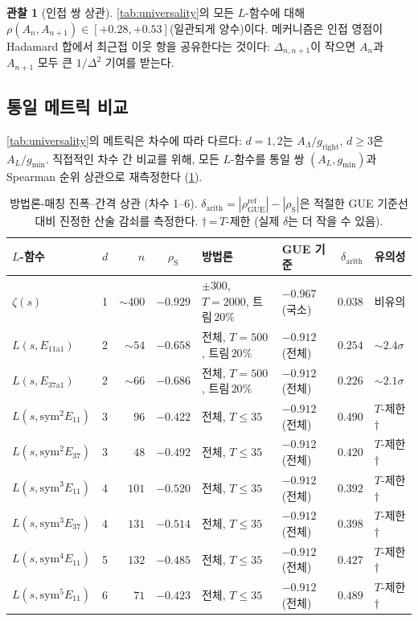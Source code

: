 \documentclass[11pt,a4paper]{article}
\theoremstyle{plain}
\theoremstyle{definition}
\newtheorem{observation}[theorem]{관찰}
\DeclareMathOperator{\GUE}{GUE}
\newcommand{\La}{\Lambda}
\begin{document}
\begin{observation}[인접 쌍 상관]\label{obs:adjacent}
\cref{tab:universality}의 모든 $L$-함수에 대해
$\rho(A_n, A_{n+1}) \in [+0.28, +0.53]$(일관되게 양수)이다.
메커니즘은 인접 영점이 Hadamard 합에서 최근접 이웃 항을 공유한다는 것이다:
$\Delta_{n,n+1}$이 작으면 $A_n$과 $A_{n+1}$ 모두 큰 $1/\Delta^2$ 기여를 받는다.
\end{observation}

\subsection{통일 메트릭 비교}
\label{ssec:unified}

\cref{tab:universality}의 메트릭은 차수에 따라 다르다:
$d = 1,2$는 $A_\La / g_{\mathrm{right}}$, $d \ge 3$은
$A_L / g_{\min}$.
직접적인 차수 간 비교를 위해, 모든 $L$-함수를
통일 쌍 $(A_L, g_{\min})$과 Spearman 순위 상관으로 재측정한다
(\cref{tab:unified}).

\begin{table}[h]
\centering
\caption{방법론-매칭 진폭--간격 상관 (차수 1--6).
$\delta_{\mathrm{arith}} = |\rho_{\GUE}^{\text{ref}}| - |\rho_{\mathrm{S}}|$은
적절한 GUE 기준선 대비 진정한 산술 감쇠를 측정한다.
$\dagger$\,=\,$T$-제한 (실제 $\delta$는 더 작을 수 있음).}
\label{tab:unified}
\small
\begin{tabular}{llrcllrl}
\toprule
\textbf{$L$-함수} & $d$ & $n$ &
$\rho_{\mathrm{S}}$ & \textbf{방법론} &
\textbf{GUE 기준} & $\delta_{\mathrm{arith}}$ & \textbf{유의성} \\
\midrule
$\zeta(s)$ & 1 & ${\sim}400$ & $-0.929$ &
  $\pm 300$, $T\!=\!2000$, 트림\,$20\%$ &
  $-0.967$ (국소) & $0.038$ & 비유의 \\
$L(s,E_{11\mathrm{a}1})$ & 2 & ${\sim}54$ & $-0.658$ &
  전체, $T\!=\!500$, 트림\,$20\%$ &
  $-0.912$ (전체) & $0.254$ & ${\sim}2.4\sigma$ \\
$L(s,E_{37\mathrm{a}1})$ & 2 & ${\sim}66$ & $-0.686$ &
  전체, $T\!=\!500$, 트림\,$20\%$ &
  $-0.912$ (전체) & $0.226$ & ${\sim}2.1\sigma$ \\
$L(s,\mathrm{sym}^2 E_{11})$ & 3 & $96$ & $-0.422$ &
  전체, $T\!\le\!35$ &
  $-0.912$ (전체) & $0.490$ & $T$-제한$\dagger$ \\
$L(s,\mathrm{sym}^2 E_{37})$ & 3 & $48$ & $-0.492$ &
  전체, $T\!\le\!35$ &
  $-0.912$ (전체) & $0.420$ & $T$-제한$\dagger$ \\
$L(s,\mathrm{sym}^3 E_{11})$ & 4 & $101$ & $-0.520$ &
  전체, $T\!\le\!35$ &
  $-0.912$ (전체) & $0.392$ & $T$-제한$\dagger$ \\
$L(s,\mathrm{sym}^3 E_{37})$ & 4 & $131$ & $-0.514$ &
  전체, $T\!\le\!35$ &
  $-0.912$ (전체) & $0.398$ & $T$-제한$\dagger$ \\
$L(s,\mathrm{sym}^4 E_{11})$ & 5 & $132$ & $-0.485$ &
  전체, $T\!\le\!35$ &
  $-0.912$ (전체) & $0.427$ & $T$-제한$\dagger$ \\
$L(s,\mathrm{sym}^5 E_{11})$ & 6 & $71$ & $-0.423$ &
  전체, $T\!\le\!35$ &
  $-0.912$ (전체) & $0.489$ & $T$-제한$\dagger$ \\
\bottomrule
\end{tabular}
\end{table}
\end{document}

